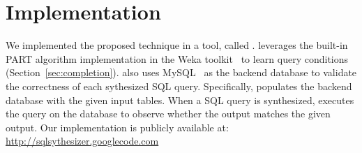 
\section{Implementation}
\label{sec:implementation}

We implemented the proposed technique in a tool, called \ourtool. 
\ourtool leverages the built-in PART algorithm implementation in
the Weka toolkit~\cite{Hall:2009} to learn query conditions
(Section~\ref{sec:completion}). \ourtool also uses
MySQL~\cite{mysql} as the backend
database to validate the correctness of each sythesized
SQL query. Specifically, \ourtool populates the backend database
with the given input tables. When a SQL query is
synthesized, \ourtool executes the query on the database
to observe whether the output matches the given output.
Our implementation is publicly available at:
\url{http://sqlsythesizer.googlecode.com}
